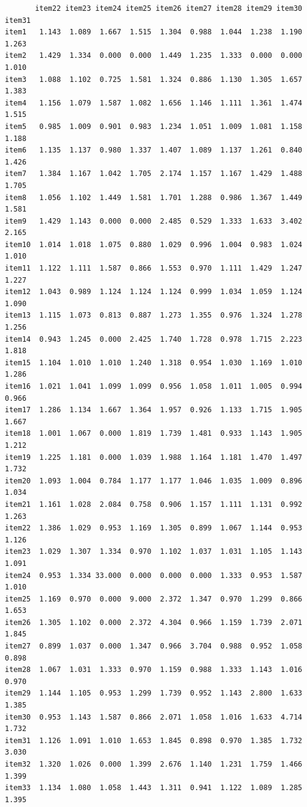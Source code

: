 \documentclass[
  a4paper,
]{ltjsbook}
\begin{document}
\begin{verbatim}
       item22 item23 item24 item25 item26 item27 item28 item29 item30 item31
item1   1.143  1.089  1.667  1.515  1.304  0.988  1.044  1.238  1.190  1.263
item2   1.429  1.334  0.000  0.000  1.449  1.235  1.333  0.000  0.000  1.010
item3   1.088  1.102  0.725  1.581  1.324  0.886  1.130  1.305  1.657  1.383
item4   1.156  1.079  1.587  1.082  1.656  1.146  1.111  1.361  1.474  1.515
item5   0.985  1.009  0.901  0.983  1.234  1.051  1.009  1.081  1.158  1.188
item6   1.135  1.137  0.980  1.337  1.407  1.089  1.137  1.261  0.840  1.426
item7   1.384  1.167  1.042  1.705  2.174  1.157  1.167  1.429  1.488  1.705
item8   1.056  1.102  1.449  1.581  1.701  1.288  0.986  1.367  1.449  1.581
item9   1.429  1.143  0.000  0.000  2.485  0.529  1.333  1.633  3.402  2.165
item10  1.014  1.018  1.075  0.880  1.029  0.996  1.004  0.983  1.024  1.010
item11  1.122  1.111  1.587  0.866  1.553  0.970  1.111  1.429  1.247  1.227
item12  1.043  0.989  1.124  1.124  1.124  0.999  1.034  1.059  1.124  1.090
item13  1.115  1.073  0.813  0.887  1.273  1.355  0.976  1.324  1.278  1.256
item14  0.943  1.245  0.000  2.425  1.740  1.728  0.978  1.715  2.223  1.818
item15  1.104  1.010  1.010  1.240  1.318  0.954  1.030  1.169  1.010  1.286
item16  1.021  1.041  1.099  1.099  0.956  1.058  1.011  1.005  0.994  0.966
item17  1.286  1.134  1.667  1.364  1.957  0.926  1.133  1.715  1.905  1.667
item18  1.001  1.067  0.000  1.819  1.739  1.481  0.933  1.143  1.905  1.212
item19  1.225  1.181  0.000  1.039  1.988  1.164  1.181  1.470  1.497  1.732
item20  1.093  1.004  0.784  1.177  1.177  1.046  1.035  1.009  0.896  1.034
item21  1.161  1.028  2.084  0.758  0.906  1.157  1.111  1.131  0.992  1.263
item22  1.386  1.029  0.953  1.169  1.305  0.899  1.067  1.144  0.953  1.126
item23  1.029  1.307  1.334  0.970  1.102  1.037  1.031  1.105  1.143  1.091
item24  0.953  1.334 33.000  0.000  0.000  0.000  1.333  0.953  1.587  1.010
item25  1.169  0.970  0.000  9.000  2.372  1.347  0.970  1.299  0.866  1.653
item26  1.305  1.102  0.000  2.372  4.304  0.966  1.159  1.739  2.071  1.845
item27  0.899  1.037  0.000  1.347  0.966  3.704  0.988  0.952  1.058  0.898
item28  1.067  1.031  1.333  0.970  1.159  0.988  1.333  1.143  1.016  0.970
item29  1.144  1.105  0.953  1.299  1.739  0.952  1.143  2.800  1.633  1.385
item30  0.953  1.143  1.587  0.866  2.071  1.058  1.016  1.633  4.714  1.732
item31  1.126  1.091  1.010  1.653  1.845  0.898  0.970  1.385  1.732  3.030
item32  1.320  1.026  0.000  1.399  2.676  1.140  1.231  1.759  1.466  1.399
item33  1.134  1.080  1.058  1.443  1.311  0.941  1.122  1.089  1.285  1.395

\end{verbatim}
\end{document}
